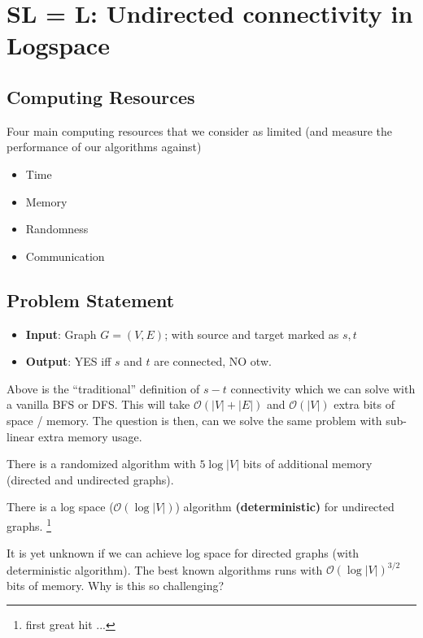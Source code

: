 \chapter{SL = L: Undirected connectivity in Logspace}

\section{Computing Resources}
Four main computing resources that we consider as limited (and measure the performance of our algorithms against)
\begin{itemize}
	\item Time 
	\item Memory
	\item Randomness
	\item Communication
\end{itemize}

\section{Problem Statement}

\begin{itemize}
	\item \textbf{Input}: Graph $G = (V, E)$; with source and target marked as $s, t$
	\item \textbf{Output}: YES iff $s$ and $t$ are connected, NO otw.
\end{itemize}

Above is the ``traditional'' definition of $s-t$ connectivity which we can solve with a vanilla BFS or DFS. This will take $\mathcal O ( |V| + |E| ) $ and $\mathcal O (|V| )$ extra bits of space / memory. The question is then, can we solve the same problem with sub-linear extra memory usage. 

\begin{proposition}
	There is a randomized algorithm with $5 \log |V|$ bits of additional memory (directed and undirected graphs). 
\end{proposition}

\begin{proposition}
	There is a log space ($\mathcal O ( \log | V | )$) algorithm \textbf{(deterministic)} for undirected graphs. \footnote{first great hit ...}
\end{proposition}

It is yet unknown if we can achieve log space for directed graphs (with deterministic algorithm). The best known algorithms runs with $\mathcal O (\log |V| ) ^{3/2}$ bits of memory. Why is this so challenging? 

